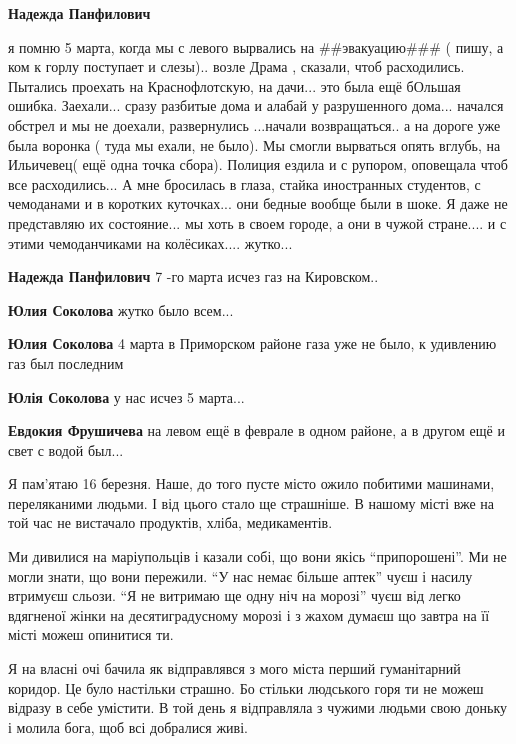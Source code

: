 \begin{itemize} %
\textbf{Надежда Панфилович} 

я помню 5 марта, когда мы с левого вырвались на \#\#эвакуацию\#\#\# ( пишу, а ком к
горлу поступает и слезы).. возле Драма , сказали, чтоб расходились. Пытались
проехать на Краснофлотскую, на дачи... это была ещё бОльшая ошибка.
Заехали... сразу разбитые дома и алабай у разрушенного дома... начался обстрел и
мы не доехали, развернулись ...начали возвращаться.. а на дороге уже была
воронка ( туда мы ехали, не было). Мы смогли вырваться опять вглубь, на
Ильичевец( ещё одна точка сбора). Полиция ездила и с рупором, оповещала чтоб
все расходились... А мне бросилась в глаза, стайка иностранных студентов, с
чемоданами и в коротких куточках... они бедные вообще были в шоке. Я даже не
представляю их состояние... мы хоть в своем городе, а они в чужой стране.... и с
этими чемоданчиками на колёсиках.... жутко...

\textbf{Надежда Панфилович} 7 -го марта исчез газ на Кировском..

\textbf{Юлия Соколова} жутко было всем...

\textbf{Юлия Соколова} 4 марта в Приморском районе газа уже не было, к удивлению газ был последним

\textbf{Юлія Соколова} у нас исчез 5 марта...

\textbf{Евдокия Фрушичева} на левом ещё в феврале в одном районе, а в другом ещё и свет с водой был...

\end{itemize} %


Я пам'ятаю 16 березня. Наше, до того пусте місто ожило побитими машинами,
переляканими людьми. І від цього стало ще страшніше. В нашому місті вже на той
час не вистачало продуктів, хліба, медикаментів.

Ми дивилися на маріупольців і казали собі, що вони якісь \enquote{припорошені}.
Ми не могли знати, що вони пережили. \enquote{У нас немає більше аптек} чуєш і
насилу втримуєш сльози. \enquote{Я не витримаю ще одну ніч на морозі} чуєш від
легко вдягненої жінки на десятиградусному морозі і з жахом думаєш що завтра на
її місті можеш опинитися ти.

Я на власні очі бачила як відправлявся з мого міста перший гуманітарний
коридор. Це було настільки страшно. Бо стільки людського горя ти не можеш
відразу в себе умістити. В той день я відправляла з чужими людьми свою доньку і
молила бога, щоб всі добралися живі.

